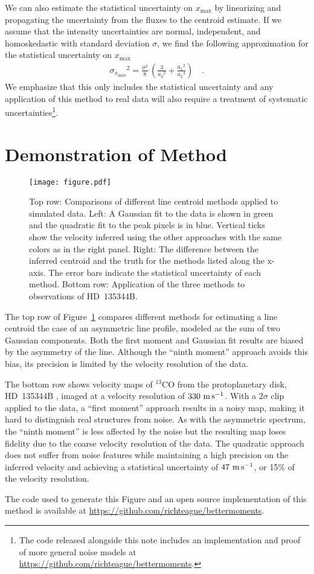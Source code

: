 \documentclass[rnaas]{aastex62}
\begin{document}
We can also estimate the statistical uncertainty on $x_\mathrm{max}$ by
linearizing and propagating the uncertainty from the fluxes to the centroid
estimate.
If we assume that the intensity uncertainties are normal, independent, and
homoskedastic with standard deviation $\sigma$, we find the
following approximation for the statistical uncertainty on $x_\mathrm{max}$
\begin{eqnarray}
{\sigma_{x_\mathrm{max}}}^2 = \frac{\sigma^2}{8}\,\left(
    \frac{3}{{a_2}^2} + \frac{{a_1}^2}{{a_2}^4}
\right)\quad.
\end{eqnarray}
We emphasize that this only includes the statistical uncertainty and any
application of this method to real data will also require a treatment of
systematic uncertainties\footnote{The code released
alongside this note includes an implementation and proof of more general noise
models at \url{https://github.com/richteague/bettermoments}.}.

\section{Demonstration of Method}

\begin{figure}[htbp]
\centering
\texttt{[image: figure.pdf]}
\caption{%
Top row: Comparisons of different line centroid methods applied to simulated
data.
Left: A Gaussian fit to the data is shown in green and the quadratic fit to
the peak pixels is in blue.
Vertical ticks show the velocity inferred using the other approaches with the
same colors as in the right panel.
Right: The difference between the inferred centroid and the truth for the
methods listed along the x-axis.
The error bars indicate the statistical uncertainty of each method.
Bottom row: Application of the three methods to observations of HD~135344B.
\label{figure}}
\end{figure}

The top row of Figure~\ref{figure} compares different methods for estimating
a line centroid the case of an asymmetric line profile, modeled as the sum of
two Gaussian components.
Both the first moment and Gaussian fit results are biased by the asymmetry of
the line.
Although the ``ninth moment'' approach avoids this bias, its precision is
limited by the velocity resolution of the data.

The bottom row shows velocity maps of $^{13}$CO from the protoplanetary disk,
HD~135344B \citep[ALMA Project 2012.1.00158.S]{vanderMarel:2016}, imaged at a
velocity resolution of $330~{\rm m\,s^{-1}}$.
With a $2\sigma$ clip applied to the data, a ``first moment'' approach results
in a noisy map, making it hard to distinguish real structures from noise.
As with the asymmetric spectrum, the ``ninth moment'' is less affected by the
noise but the resulting map loses fidelity due to the coarse velocity
resolution of the data.
The quadratic approach does not suffer from noise features while maintaining a
high precision on the inferred velocity and achieving a statistical uncertainty
of $47~{\rm m\,s^{-1}}$, or 15\% of the velocity resolution.

The code used to generate this Figure and an open source implementation of
this method is available at
\url{https://github.com/richteague/bettermoments}.


\end{document}
